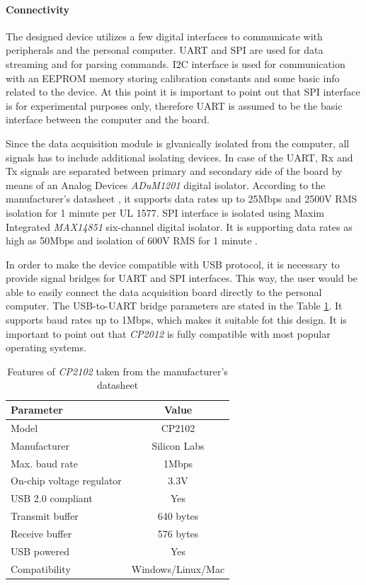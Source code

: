 \documentclass[12pt,a4paper]{article}
\begin{document}
\paragraph{Connectivity}
The designed device utilizes a few digital interfaces to communicate with peripherals and the personal computer. UART and SPI are used for data streaming and for parsing commands. I2C interface is used for communication with an EEPROM memory storing calibration constants and some basic info related to the device. At this point it is important to point out that SPI interface is for experimental purposes only, therefore UART is assumed to be the basic interface between the computer and the board.
\par
Since the data acquisition module is glvanically isolated from the computer, all signals has to include additional isolating devices. In case of the UART, Rx and Tx signals are separated between primary and secondary side of the board by means of an Analog Devices \textit{ADuM1201} digital isolator. According to the manufacturer's datasheet \cite{adum1201_params}, it supports data rates up to 25Mbps and 2500V RMS isolation for 1 minute per UL 1577. SPI interface is isolated using Maxim Integrated \textit{MAX14851} six-channel digital isolator. It is supporting data rates as high as 50Mbps and isolation of 600V RMS for 1 minute \cite{max14851_params}.
\par
In order to make the device compatible with USB protocol, it is necessary to provide signal bridges for UART and SPI interfaces. This way, the user would be able to easily connect the data acquisition board directly to the personal computer. The USB-to-UART bridge parameters are stated in the Table \ref{tab:cp2102_params}. It supports baud rates up to 1Mbps, which makes it suitable fot this design. It is important to point out that \textit{CP2012} is fully compatible with most popular operating systems.

\begin{table}[ht!]
\begin{tabular}{|l|c|}
\hline
\textbf{Parameter}	& \textbf{Value} 	\\ \hline
Model  				& CP2102       \\ \hline
Manufacturer    	& Silicon Labs	\\ \hline
Max. baud rate       	&  1Mbps 		\\ \hline
On-chip voltage regulator     &  3.3V			\\ \hline
USB 2.0 compliant        &  Yes			\\ \hline
Transmit buffer        &  640 bytes				\\ \hline
Receive buffer 		&  576 bytes		\\ \hline
USB powered 	&  Yes 		\\ \hline
Compatibility 	&  Windows/Linux/Mac  		\\ \hline
\end{tabular}
\caption{Features of \textit{CP2102} taken from the manufacturer's datasheet \cite{cp2102_params}}
\label{tab:cp2102_params}
\end{table}
\end{document}
